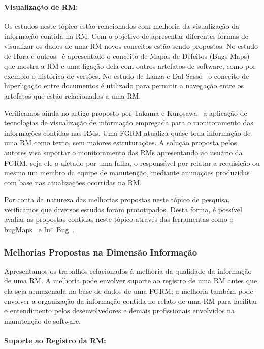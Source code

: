 \paragraph{Visualização de RM:} Os estudos neste tópico estão relacionados com
melhoria da visualização da informação contida na RM\@. Com o objetivo de
apresentar diferentes formas de visualizar os dados de uma RM novos conceitos
estão sendo propostos. No estudo de Hora e outros~\cite{hora2012bug} é
apresentado o conceito de Mapas de Defeitos (Bugs Maps) que mostra a RM e uma
ligação dela com outros artefatos de software, como por exemplo o histórico de
versões.  No estudo de Lanza e  Dal Sasso~\cite{dal2014bug} o conceito de
hiperligação entre documentos é utilizado para permitir a navegação entre os
artefatos que estão relacionados a uma RM\@.

Verificamos ainda no artigo proposto por Takama e
Kurosawa~\cite{takama2013application} a aplicação de tecnologias de visualização
de informação empregada para o monitoramento das informações contidas nas RMs.
Uma FGRM atualiza quase toda informação de uma RM como texto, sem maiores
estruturações. A solução proposta pelos autores visa suportar o monitoramento das
RMs apresentando ao usuário da FGRM, seja ele o afetado por uma falha, o
responsável por relatar a requisição ou mesmo um membro da equipe de manutenção,
mediante animações produzidas com base nas atualizações ocorridas na RM\@.

Por conta da natureza das melhorias propostas neste tópico de pesquisa,
verificamos que diversos estudos foram prototipados. Desta forma, é possível
avaliar as propostas contidas neste tópico através das ferramentas como o
bugMaps~\cite{hora2012bug} e In* Bug~\cite{dal2014bug}.

\subsubsection{Melhorias Propostas na Dimensão Informação}
\label{ssub:melhorias_dim_informacao}

Apresentamos os trabalhos relacionados à melhoria da qualidade da informação de
uma RM\@. A melhoria pode envolver suporte ao registro de uma RM antes que ela
seja armazenada na base de dados de uma FGRM\@; a melhoria também pode envolver
a organização da informação contida no relato de uma RM para facilitar o
entendimento pelos desenvolvedores e demais profissionais envolvidos na
manutenção de software.

\paragraph{Suporte ao Registro da RM:}

